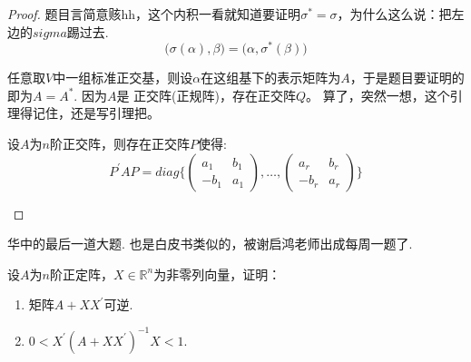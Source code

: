 \begin{proof}
	题目言简意赅hh，这个内积一看就知道要证明$\sigma^\ast = \sigma$，为什么这么说：把左边的$sigma$踢过去.
	$$
		\bigl( \sigma(\alpha), \beta \bigr) = \bigl( \alpha, \sigma^\ast (\beta)\bigr)
	$$

	任意取$V$中一组标准正交基，则设$\alpha$在这组基下的表示矩阵为$A$，于是题目要证明的即为$A=A^\ast$. 因为$A$是
	正交阵(正规阵)，存在正交阵$Q$。  算了，突然一想，这个引理得记住，还是写引理把。

	\begin{lemma}[正交阵的正交相似标准型]
		设$A$为$n$阶正交阵，则存在正交阵$P$使得:
		$$
			P^\prime A P = diag \{ \begin{pmatrix}
				a_1 & b_1 \\
				-b_1 & a_1
			\end{pmatrix}, \dots, \begin{pmatrix}
				a_r & b_r \\
				-b_r & a_r
			\end{pmatrix} \}
		$$
	\end{lemma}
\end{proof}

华中的最后一道大题. 也是白皮书类似的，被谢启鸿老师出成每周一题了.

\begin{ex}[华中2021]
	设$A$为$n$阶正定阵，$X\in \mathbb{R}^n$为非零列向量，证明：
	\begin{enumerate}[(1)]
		\item 矩阵$A+XX^\prime$可逆.
		\item $0<X^\prime (A+XX^\prime)^{-1}X<1$.
	\end{enumerate}
\end{ex}

